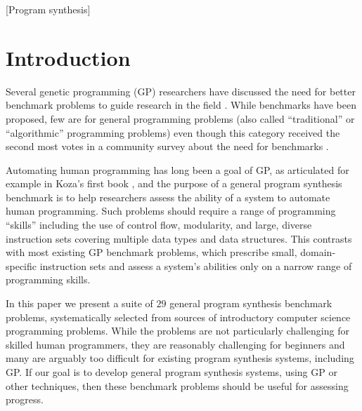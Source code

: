 \documentclass{sig-alternate}
\begin{document}
[Program synthesis]




\section{Introduction}

Several genetic programming (GP) researchers have discussed the need for better benchmark problems to guide research in the field \cite{McDermott:2012:GECCO, White:2013:BGB:2441218.2441242}. While benchmarks have been proposed, few are for general programming problems (also called ``traditional'' or ``algorithmic'' programming problems) even though this category received the second most votes in a community survey about the need for benchmarks \cite{White:2013:BGB:2441218.2441242}. 

Automating human programming has long been a goal of GP, as articulated for example in Koza's first book \cite{koza:book}, and the purpose of a general program synthesis benchmark is to help researchers assess the ability of a system to automate human programming. Such problems should require a range of programming ``skills'' including the use of control flow, modularity, and large, diverse instruction sets covering multiple data types and data structures. This contrasts with most existing GP benchmark problems, which prescribe small, domain-specific instruction sets and assess a system's abilities only on a narrow range of programming skills.

In this paper we present a suite of $29$ general program synthesis benchmark problems, systematically selected from sources of introductory computer science programming problems. While the problems are not particularly challenging for skilled human programmers, they are reasonably challenging for beginners and many are arguably too difficult for existing program synthesis systems, including GP. If our goal is to develop general program synthesis systems, using GP or other techniques, then these benchmark problems should be useful for assessing progress.
\end{document}
